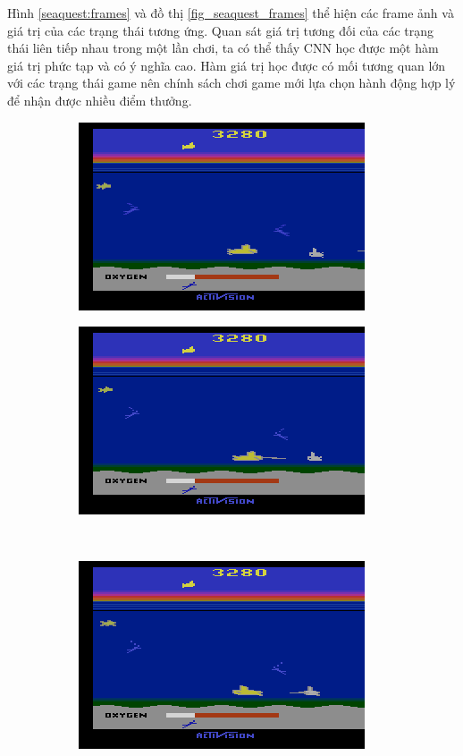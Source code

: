 	Hình \ref{seaquest:frames} và đồ thị \ref{fig_seaquest_frames} thể hiện các frame ảnh và giá trị của các trạng thái tương ứng.
	Quan sát giá trị tương đối của các trạng thái liên tiếp nhau trong một lần chơi, ta có thể thấy CNN học được một hàm giá trị phức tạp và có ý nghĩa cao.
	Hàm giá trị học được có mối tương quan lớn với các trạng thái game nên chính sách chơi game mới lựa chọn hành động hợp lý để nhận được nhiều điểm thưởng.
	
	\begin{figure}
		\begin{subfigure}{.5\textwidth}
			\centering
			\includegraphics[width=.8\linewidth]{008182}
			\caption{}
			\label{seaquest:frame_1}
		\end{subfigure}%
		\begin{subfigure}{.5\textwidth}
			\centering
			\includegraphics[width=.8\linewidth]{008185}
			\caption{}
			\label{seaquest:frame_2}
		\end{subfigure}\\[2ex]
		\begin{subfigure}{.5\textwidth}
			\centering
			\includegraphics[width=.8\linewidth]{008188}

\end{subfigure}
\end{figure}
